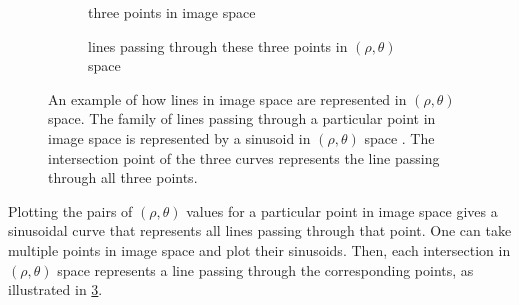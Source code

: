 \documentclass[../report.tex]{subfiles}
\begin{document}
\begin{figure}
    \centering
    \begin{subfigure}[t]{0.4\textwidth}
        \caption{three points in image space}
        \label{fig:hough_points_image_space}
    \end{subfigure}
    \hfill
    \begin{subfigure}[t]{0.56\textwidth}
        \caption{lines passing through these three points in $(\rho,\theta)$ space}
        \label{fig:hough_points_parameter_space}
    \end{subfigure}
    \caption[An example of how lines in image space are represented in $(\rho,\theta)$ space.]{An example of how lines in image space are represented in $(\rho,\theta)$ space. The family of lines passing through a particular point in image space  is represented by a sinusoid in $(\rho,\theta)$ space . The intersection point of the three curves represents the line passing through all three points.}
    \label{fig:hough_points}
\end{figure}
Plotting the pairs of $(\rho, \theta)$ values for a particular point in image space gives a sinusoidal curve that represents all lines passing through that point.
One can take multiple points in image space and plot their sinusoids. 
Then, each intersection in $(\rho, \theta)$ space represents a line passing through the corresponding points, as illustrated in \cref{fig:hough_points}.
\end{document}
